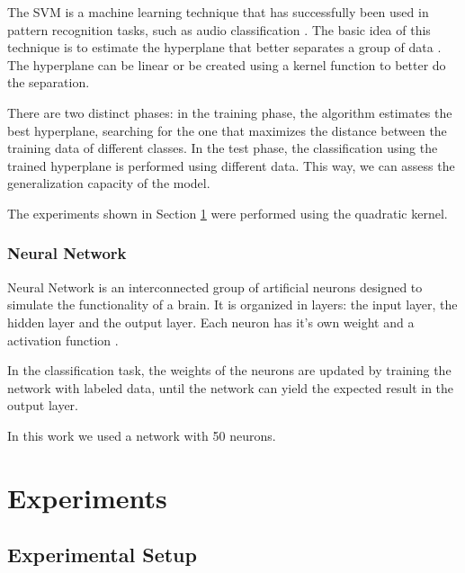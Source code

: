 \documentclass[12pt]{article}
\begin{document}
The SVM is a machine learning technique that has successfully been used in pattern recognition tasks, such as audio classification \cite{dhanalakshmi2009classification}. The basic idea of this technique is to estimate the hyperplane that better separates a group of data \cite{cumani2012analysis}. The hyperplane can be linear or be created using a kernel function to better do the separation.

There are two distinct phases: in the training phase, the algorithm estimates the best hyperplane, searching for the one that maximizes the distance between the training data of different classes. In the test phase, the classification using the trained hyperplane is performed using different data. This way, we can assess the generalization capacity of the model.

The experiments shown in Section \ref{exp} were performed using the quadratic kernel.%


\subsubsection{Neural Network} \label{class:nn}


Neural Network is an interconnected group of artificial neurons designed to simulate the functionality of a brain. It is organized in layers: the input layer, the hidden layer and the output layer. Each neuron has it's own weight and a activation function \cite{wu2007leaf}. 

In the classification task, the weights of the neurons are updated by training the network with labeled data, until the network can yield the expected result in the output layer.

In this work we used a network with 50 neurons.%


\section{Experiments} \label{exp}


\subsection{Experimental Setup} \label{exp:setup}
\end{document}
